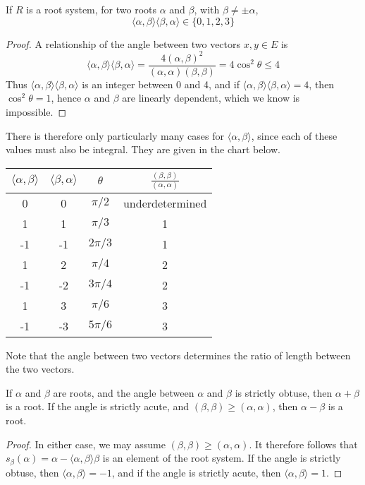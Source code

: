 \begin{lemma}
    If $R$ is a root system, for two roots $\alpha$ and $\beta$, with $\beta \neq \pm \alpha$,
    \[ \langle \alpha, \beta \rangle \langle \beta, \alpha \rangle \in \{ 0, 1, 2, 3 \} \]
\end{lemma}
\begin{proof}
    A relationship of the angle between two vectors $x,y \in E$ is
    \[ \langle \alpha, \beta \rangle \langle \beta, \alpha \rangle = \frac{4 (\alpha, \beta)^2}{(\alpha, \alpha)(\beta, \beta)} = 4\cos^2 \theta \leq 4 \]
    Thus $\langle \alpha, \beta \rangle \langle \beta, \alpha \rangle$ is an integer between 0 and 4, and if $\langle \alpha, \beta \rangle \langle \beta, \alpha \rangle = 4$, then $\cos^2 \theta = 1$, hence $\alpha$ and $\beta$ are linearly dependent, which we know is impossible.
\end{proof}

There is therefore only particularly many cases for $\langle \alpha, \beta \rangle$, since each of these values must also be integral. They are given in the chart below.

\begin{center}
\begin{tabular}{|c | c | c | c |}
    \hline
    $\langle \alpha, \beta \rangle$ & $\langle \beta, \alpha \rangle$ & $\theta$ & $\frac{(\beta, \beta)}{(\alpha, \alpha)}$\\
    \hline
    0 & 0 & $\pi/2$ & underdetermined\\
    1 & 1 & $\pi/3$ & 1\\
    -1 & -1 & $2\pi/3$ & 1\\
    1 & 2 & $\pi/4$ & 2\\
    -1 & -2 & $3\pi/4$ & 2\\
    1 & 3 & $\pi/6$ & 3\\
    -1 & -3 & $5\pi/6$ & 3\\
    \hline
\end{tabular}
\end{center}

Note that the angle between two vectors determines the ratio of length between the two vectors.

\begin{theorem}
    If $\alpha$ and $\beta$ are roots, and the angle between $\alpha$ and $\beta$ is strictly obtuse, then $\alpha + \beta$ is a root. If the angle is strictly acute, and $(\beta, \beta) \geq (\alpha, \alpha)$, then $\alpha - \beta$ is a root.
\end{theorem}
\begin{proof}
    In either case, we may assume $(\beta, \beta) \geq (\alpha, \alpha)$. It therefore follows that $s_\beta(\alpha) = \alpha - \langle \alpha, \beta \rangle \beta$ is an element of the root system. If the angle is strictly obtuse, then $\langle \alpha, \beta \rangle = -1$, and if the angle is strictly acute, then $\langle \alpha, \beta \rangle = 1$.
\end{proof}

